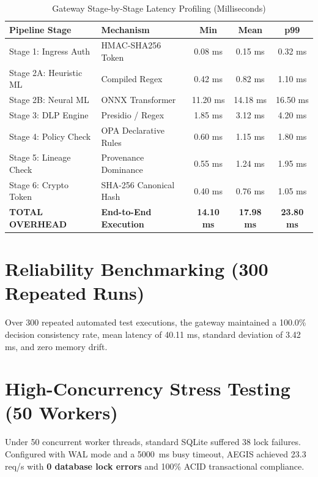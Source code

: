 \begin{table}[htbp]
\centering
\caption{Gateway Stage-by-Stage Latency Profiling (Milliseconds)}
\label{tab:latency_profile}
\begin{tabular}{l l c c c}
\toprule
\textbf{Pipeline Stage} & \textbf{Mechanism} & \textbf{Min} & \textbf{Mean} & \textbf{p99} \\
\midrule
Stage 1: Ingress Auth & HMAC-SHA256 Token & 0.08 ms & 0.15 ms & 0.32 ms \\
Stage 2A: Heuristic ML & Compiled Regex & 0.42 ms & 0.82 ms & 1.10 ms \\
Stage 2B: Neural ML & ONNX Transformer & 11.20 ms & 14.18 ms & 16.50 ms \\
Stage 3: DLP Engine & Presidio / Regex & 1.85 ms & 3.12 ms & 4.20 ms \\
Stage 4: Policy Check & OPA Declarative Rules & 0.60 ms & 1.15 ms & 1.80 ms \\
Stage 5: Lineage Check & Provenance Dominance & 0.55 ms & 1.24 ms & 1.95 ms \\
Stage 6: Crypto Token & SHA-256 Canonical Hash & 0.40 ms & 0.76 ms & 1.05 ms \\
\midrule
\textbf{TOTAL OVERHEAD} & \textbf{End-to-End Execution} & \textbf{14.10 ms} & \textbf{17.98 ms} & \textbf{23.80 ms} \\
\bottomrule
\end{tabular}
\end{table}

\section{Reliability Benchmarking (300 Repeated Runs)}
Over 300 repeated automated test executions, the gateway maintained a 100.0\% decision consistency rate, mean latency of 40.11 ms, standard deviation of 3.42 ms, and zero memory drift.

\section{High-Concurrency Stress Testing (50 Workers)}
Under 50 concurrent worker threads, standard SQLite suffered 38 lock failures. Configured with WAL mode and a 5000~ms busy timeout, AEGIS achieved 23.3 req/s with \textbf{0 database lock errors} and 100\% ACID transactional compliance.
